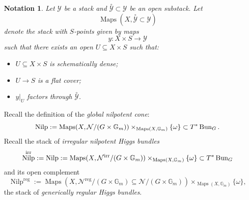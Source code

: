 \documentclass[9pt]{amsart}
\DeclareMathOperator{\reg}{{reg}}
\newcommand{\bG}{{\mathbb G}}
\newcommand{\cN}{{\mathcal N}}
\newcommand{\cY}{{\mathcal Y}}
\DeclareMathOperator{\Maps}{{Maps}}
\DeclareMathOperator{\irr}{{irr}} \DeclareMathOperator{\Eis}{{Eis}}
\DeclareMathOperator{\Nilp}{{Nilp}} \DeclareMathOperator{\op}{{op}}
\newtheorem{ntn}[subsubsection]{Notation}
\numberwithin{equation}{section}
\begin{document}
	\begin{ntn}
		Let $\cY$ be a stack and $\stackrel{\circ}{\cY} \subset \cY$ be an open substack. Let $$\Maps(X, \stackrel{\circ}{\cY} \subset \cY)$$ denote the stack with $S$-points given by maps 
		$$y: X \times S \rightarrow \cY$$
		such that there exists an open $U \subseteq X \times S$ such that:
		\begin{itemize}
			\item $U \subseteq X\times S$ is schematically dense;
			\item $U \rightarrow S$ is a flat cover;
			\item $y|_{U}$ factors through $\stackrel{\circ}{\cY}$.
		\end{itemize}
	\end{ntn}
	
	Recall the definition of the \emph{global nilpotent cone}: $$\Nilp:= \Maps(X, \cN / (G \times \bG_m))\times_{\Maps(X,\bG_m)} \{\omega\} \subset T^* \Bun_G.$$ Recall the stack of \emph{irregular nilpotent Higgs bundles}
	$$\Nilp^{\irr} := \Nilp:= \Maps(X, \cN^{\irr} / (G \times \bG_m))\times_{\Maps(X,\bG_m)} \{\omega\} \subset T^* \Bun_G$$
	and its open complement $$\Nilp^{\reg} := \Maps(X, \cN^{\reg} / (G \times \bG_m) \subseteq \cN/ (G \times \bG_m))\times_{\Maps(X,\bG_m)} \{\omega\},$$
	the stack of \emph{generically regular Higgs bundles}.
	
\end{document}
